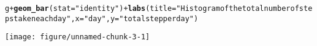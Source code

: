 \documentclass{article}\usepackage[]{graphicx}\usepackage[]{color}
\makeatletter
\def\maxwidth{ %
  \ifdim\Gin@nat@width>\linewidth
    \linewidth
  \else
    \Gin@nat@width
  \fi
}
\newcommand{\hlstr}[1]{\textcolor[rgb]{0.192,0.494,0.8}{#1}}%
\newcommand{\hlopt}[1]{\textcolor[rgb]{0,0,0}{#1}}%
\newcommand{\hlstd}[1]{\textcolor[rgb]{0.345,0.345,0.345}{#1}}%
\newcommand{\hlkwc}[1]{\textcolor[rgb]{0.333,0.667,0.333}{#1}}%
\newcommand{\hlkwd}[1]{\textcolor[rgb]{0.737,0.353,0.396}{\textbf{#1}}}%
\newenvironment{kframe}{%
 \def\at@end@of@kframe{}%
 \ifinner\ifhmode%
  \def\at@end@of@kframe{\end{minipage}}%
  \begin{minipage}{\columnwidth}%
 \fi\fi%
 \def\FrameCommand##1{\hskip\@totalleftmargin \hskip-\fboxsep
 \colorbox{shadecolor}{##1}\hskip-\fboxsep
     \hskip-\linewidth \hskip-\@totalleftmargin \hskip\columnwidth}%
 \MakeFramed {\advance\hsize-\width
   \@totalleftmargin\z@ \linewidth\hsize
   \@setminipage}}%
 {\par\unskip\endMakeFramed%
 \at@end@of@kframe}
\newenvironment{knitrout}{}{} %
\makeatother
\begin{document}
\begin{knitrout}
\color{fgcolor}\begin{kframe}
\begin{alltt}
\hlstd{g} \hlopt{+} \hlkwd{geom_bar}\hlstd{(}\hlkwc{stat} \hlstd{=} \hlstr{"identity"}\hlstd{)} \hlopt{+} \hlkwd{labs}\hlstd{(}\hlkwc{title} \hlstd{=} \hlstr{"Histogram of the total number of steps taken each day"}\hlstd{,} \hlkwc{x} \hlstd{=} \hlstr{"day"}\hlstd{,} \hlkwc{y} \hlstd{=} \hlstr{"total step per day"}\hlstd{)}
\end{alltt}


{\ttfamily\noindent\color{warningcolor}{\#\# Warning: Removed 2304 rows containing missing values (position\_stack).}}\end{kframe}
\texttt{[image: figure/unnamed-chunk-3-1]} 

\end{knitrout}
\end{document}
